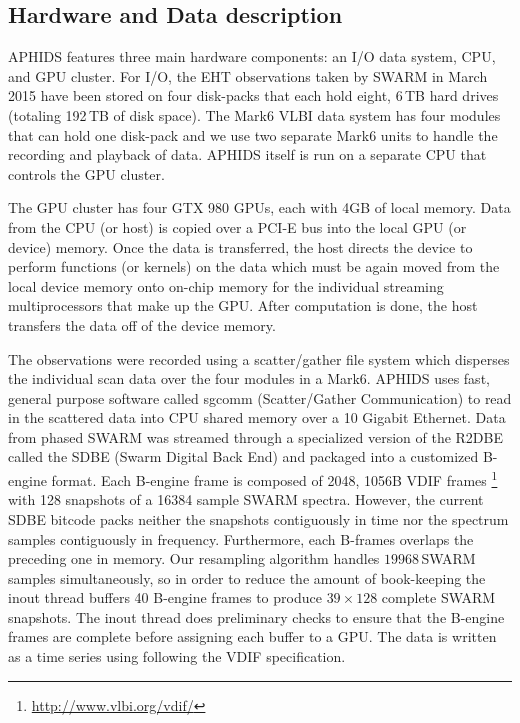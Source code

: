 \subsection{Hardware and Data description}

APHIDS features three main hardware components: an I/O data system, CPU, and GPU cluster.  For I/O, the 
EHT observations taken by SWARM in March 2015 have been stored on four disk-packs that each hold eight, 
6\,TB hard drives (totaling 192\,TB of disk space).  The Mark6 VLBI data system has four modules 
that can hold one disk-pack and we use
two separate Mark6 units to handle the recording and playback of data.  APHIDS itself is run on a separate CPU 
that controls the GPU cluster.

The GPU cluster has four GTX 980 GPUs, each with 4GB of local memory.  Data from the CPU (or host) is copied over 
a PCI-E bus into the local GPU (or device) memory.  Once the data is transferred, the host directs the device
to perform functions (or kernels) on the data which must be again moved from the local device memory onto 
on-chip memory for the individual streaming multiprocessors that make up the GPU.  After computation is done, 
the host transfers the data off of the device memory.

The observations were recorded using a scatter/gather file system which disperses the 
individual scan data over the four modules in a Mark6.  APHIDS uses fast, general purpose software called 
sgcomm (Scatter/Gather Communication) to read in 
the scattered data into CPU shared memory over a 10 Gigabit Ethernet.  Data from phased SWARM was 
streamed through a specialized version of the R2DBE called the SDBE (Swarm Digital Back End) and packaged into
a customized B-engine format.  Each B-engine frame is composed of 2048, 1056B VDIF frames 
\footnote{\url{http://www.vlbi.org/vdif/}} with 128 snapshots of a 
16384 sample SWARM spectra.  However, the current SDBE bitcode packs
neither the snapshots contiguously in time nor the spectrum samples contiguously in frequency.  Furthermore, 
each B-frames overlaps the preceding one in memory.  Our resampling algorithm handles $19968$\,SWARM samples
simultaneously, so in order to reduce the amount of book-keeping the inout thread buffers 40 B-engine frames to 
produce $39 \times 128$ complete SWARM snapshots.  The inout thread does preliminary checks to ensure that the 
B-engine frames are complete before assigning each buffer to a GPU.  The data is written as a time series using 
following the VDIF specification.

